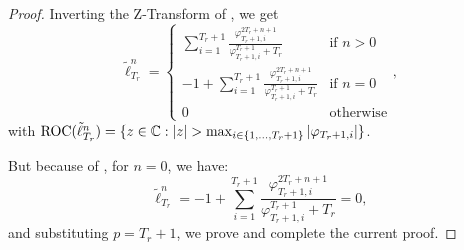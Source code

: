 \documentclass{article}
\begin{document}
    \begin{proof}
      Inverting the Z-Transform of , we get 
      \begin{equation}
        \tilde{\ell}_{T_r}^{n} = 
        \left\{
          \begin{array}{ll}
            \sum_{i = 1}^{T_r + 1} \frac{\varphi_{T_r + 1, i}^{2T_r + n + 1}}
            {\varphi_{T_r + 1, i}^{T_r + 1} + T_r} & \mbox{if } n > 0 \\
            -1 + \sum_{i = 1}^{T_r + 1} \frac{\varphi_{T_r + 1, i}^{2T_r + n + 1}}
            {\varphi_{T_r + 1, i}^{T_r + 1} + T_r} & \mbox{if } n = 0 \\
            0 & \mbox{otherwise}
          \end{array}
        \right.,
      \end{equation}
      with $\textnormal{ROC}(\tilde{\ell}_{T_r}^{n}) = \{z \in \mathbb C : |z| > \max_{i \in \{1, \dots, T_r + 1\}} |\varphi_{T_r + 1, i}|\}$.

      But because of , for $n = 0$, we have:
      \begin{equation}
        \tilde{\ell}_{T_r}^{n} = 
            -1 + \sum_{i = 1}^{T_r + 1} \frac{\varphi_{T_r + 1, i}^{2T_r + n + 1}}
            {\varphi_{T_r + 1, i}^{T_r + 1} + T_r} = 0,
      \end{equation}
      and substituting $p = T_r + 1$, we prove  and complete the current proof.
    \end{proof}
\end{document}
